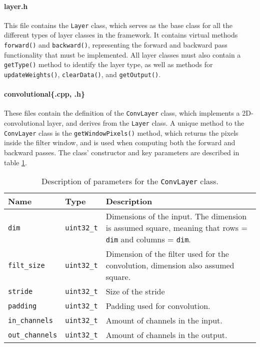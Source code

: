 \paragraph{layer.h}
This file contains the \texttt{Layer} class, which serves as the base class for all the different types of layer classes in the framework. It contains virtual methods \texttt{forward()} and \texttt{backward()}, representing the forward and backward pass functionality that must be implemented. All layer classes must also contain a \texttt{getType()} method to identify the layer type, as well as methods for \texttt{updateWeights()}, \texttt{clearData()}, and \texttt{getOutput()}.

\paragraph{convolutional\{.cpp, .h\}}
These files contain the definition of the \texttt{ConvLayer} class, which implements a 2D-convolutional layer, and derives from the \texttt{Layer} class. A unique method to the \texttt{ConvLayer} class is the \texttt{getWindowPixels()} method, which returns the pixels inside the filter window, and is used when computing both the forward and backward passes.  The class' constructor and key parameters are described in table \ref{convtable}.
\begin{table}
\centering
\begin{tabularx}{\textwidth}{|l|l|X|}
	\hline
	\textbf{Name} 			& \textbf{Type} 		& \textbf{Description} \\\hline
	\texttt{dim}  			& \texttt{uint32\_t}	& Dimensions of the input. The dimension is assumed square, meaning that rows = \texttt{dim} and columns = \texttt{dim}.\\\hline
	\texttt{filt\_size} 	& \texttt{uint32\_t}	& Dimension of the filter used for the convolution, dimension also assumed square. \\\hline 
		\texttt{stride} 	& \texttt{uint32\_t}	& Size of the stride \\\hline 
	\texttt{padding} 		& \texttt{uint32\_t}	& Padding used for convolution. \\\hline 
	\texttt{in\_channels} 	& \texttt{uint32\_t}	& Amount of channels in the input. \\\hline 
	\texttt{out\_channels} 	& \texttt{uint32\_t}	& Amount of channels in the output. \\\hline
\end{tabularx}
\caption{Description of parameters for the \texttt{ConvLayer} class.}
\label{convtable}
\end{table}



